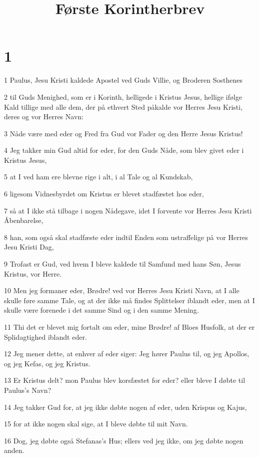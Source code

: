 

\title{Første Korintherbrev}


\chapter{1}

\par 1 Paulus, Jesu Kristi kaldede Apostel ved Guds Villie, og Broderen Sosthenes
\par 2 til Guds Menighed, som er i Korinth, helligede i Kristus Jesus, hellige ifølge Kald tillige med alle dem, der på ethvert Sted påkalde vor Herres Jesu Kristi, deres og vor Herres Navn:
\par 3 Nåde være med eder og Fred fra Gud vor Fader og den Herre Jesus Kristus!
\par 4 Jeg takker min Gud altid for eder, for den Guds Nåde, som blev givet eder i Kristus Jesus,
\par 5 at I ved ham ere blevne rige i alt, i al Tale og al Kundskab,
\par 6 ligesom Vidnesbyrdet om Kristus er blevet stadfæstet hos eder,
\par 7 så at I ikke stå tilbage i nogen Nådegave, idet I forvente vor Herres Jesu Kristi Åbenbarelse,
\par 8 han, som også skal stadfæste eder indtil Enden som ustraffelige på vor Herres Jesu Kristi Dag,
\par 9 Trofast er Gud, ved hvem I bleve kaldede til Samfund med hans Søn, Jesus Kristus, vor Herre.
\par 10 Men jeg formaner eder, Brødre! ved vor Herres Jesu Kristi Navn, at I alle skulle føre samme Tale, og at der ikke må findes Splittelser iblandt eder, men at I skulle være forenede i det samme Sind og i den samme Mening.
\par 11 Thi det er blevet mig fortalt om eder, mine Brødre! af Bloes Husfolk, at der er Splidagtighed iblandt eder.
\par 12 Jeg mener dette, at enhver af eder siger: Jeg hører Paulus til, og jeg Apollos, og jeg Kefas, og jeg Kristus.
\par 13 Er Kristus delt? mon Paulus blev korsfæstet for eder? eller bleve I døbte til Paulus's Navn?
\par 14 Jeg takker Gud for, at jeg ikke døbte nogen af eder, uden Krispus og Kajus,
\par 15 for at ikke nogen skal sige, at I bleve døbte til mit Navn.
\par 16 Dog, jeg døbte også Stefanas's Hus; ellers ved jeg ikke, om jeg døbte nogen anden.
